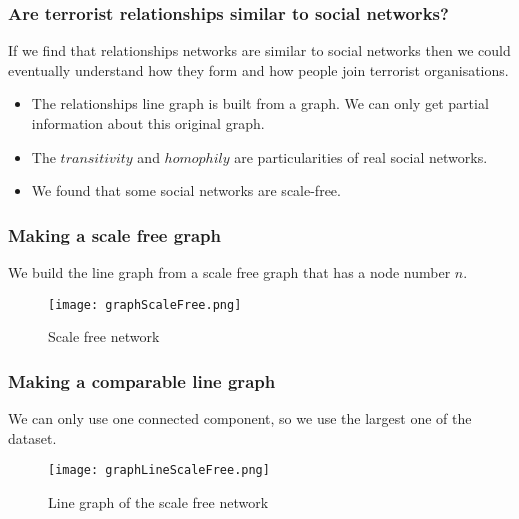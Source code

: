 \begin{frame}
\frametitle{Are terrorist relationships similar to social networks?}

If we find that relationships networks are similar to social networks then we could eventually understand how they form and how people join terrorist organisations.

\begin{itemize}
\item The relationships line graph is built from a graph. We can only get partial information about this original graph.
\item The $transitivity$ and $homophily$ are particularities of real social networks.
\item We found that some social networks are scale-free. 
\end{itemize}

\end{frame}


\begin{frame}
\frametitle{Making a scale free graph}

We build the line graph from a scale free graph that has a node number $n$.

\begin{figure}[H]
\begin{center}
        \texttt{[image: graphScaleFree.png]}
        \caption{Scale free network}
        \label{fig:Scalefree}
        \end{center}
\end{figure}
\end{frame}
    

\begin{frame}
\frametitle{Making a comparable line graph}

We can only use one connected component, so we use the largest one of the dataset.

\begin{figure}[H]
\begin{center}
    \texttt{[image: graphLineScaleFree.png]}
    \caption{Line graph of the scale free network}
    \label{fig:lineG}
\end{center}
\end{figure}
\end{frame}

